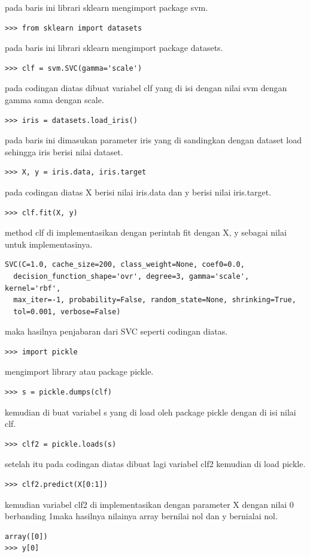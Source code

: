 \begin{enumerate}
pada baris ini  librari sklearn mengimport package svm.
\begin{verbatim}
>>> from sklearn import datasets
\end{verbatim}
pada baris ini  librari sklearn mengimport package datasets.
\begin{verbatim}
>>> clf = svm.SVC(gamma='scale')
\end{verbatim}
pada codingan diatas dibuat variabel clf yang di isi dengan nilai svm dengan gamma sama dengan scale.
\begin{verbatim}
>>> iris = datasets.load_iris()
\end{verbatim}
pada baris ini dimasukan parameter iris yang di sandingkan dengan dataset load sehingga iris berisi nilai dataset.
\begin{verbatim}
>>> X, y = iris.data, iris.target
\end{verbatim}
pada codingan diatas X berisi nilai iris.data dan y berisi nilai iris.target.
\begin{verbatim}
>>> clf.fit(X, y)
\end{verbatim}
method clf di implementasikan dengan perintah fit dengan X, y sebagai nilai untuk implementasinya.
\begin{verbatim}
SVC(C=1.0, cache_size=200, class_weight=None, coef0=0.0,
  decision_function_shape='ovr', degree=3, gamma='scale', kernel='rbf',
  max_iter=-1, probability=False, random_state=None, shrinking=True,
  tol=0.001, verbose=False)
\end{verbatim}
maka hasilnya penjabaran dari SVC seperti codingan diatas.
\begin{verbatim}
>>> import pickle
\end{verbatim}
mengimport library atau package pickle.
\begin{verbatim}
>>> s = pickle.dumps(clf)
\end{verbatim}
kemudian di buat variabel s yang di load oleh package pickle dengan di isi nilai clf.
\begin{verbatim}
>>> clf2 = pickle.loads(s)
\end{verbatim}
setelah itu pada codingan diatas dibuat lagi variabel clf2 kemudian di load pickle.
\begin{verbatim}
>>> clf2.predict(X[0:1])
\end{verbatim}
kemudian variabel clf2 di implementasikan dengan parameter X dengan nilai 0 berbanding 1maka hasilnya nilainya array bernilai nol dan y bernialai nol.
\begin{verbatim}
array([0])
>>> y[0]

\end{verbatim}
\end{enumerate}
